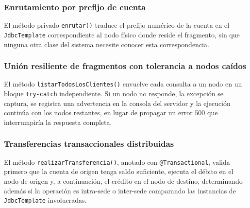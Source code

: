 \documentclass[11pt,a4paper]{article}
\begin{document}
\subsubsection{Enrutamiento por prefijo de cuenta}
El método privado \texttt{enrutar()} traduce el prefijo numérico de la cuenta en el \texttt{JdbcTemplate} correspondiente al nodo físico donde reside el fragmento, sin que ninguna otra clase del sistema necesite conocer esta correspondencia.

\subsubsection{Unión resiliente de fragmentos con tolerancia a nodos caídos}
El método \texttt{listarTodosLosClientes()} envuelve cada consulta a un nodo en un bloque \texttt{try-catch} independiente. Si un nodo no responde, la excepción se captura, se registra una advertencia en la consola del servidor y la ejecución continúa con los nodos restantes, en lugar de propagar un error 500 que interrumpiría la respuesta completa.

\subsubsection{Transferencias transaccionales distribuidas}
El método \texttt{realizarTransferencia()}, anotado con \texttt{@Transactional}, valida primero que la cuenta de origen tenga saldo suficiente, ejecuta el débito en el nodo de origen y, a continuación, el crédito en el nodo de destino, determinando además si la operación es intra-sede o inter-sede comparando las instancias de \texttt{JdbcTemplate} involucradas.
\end{document}
